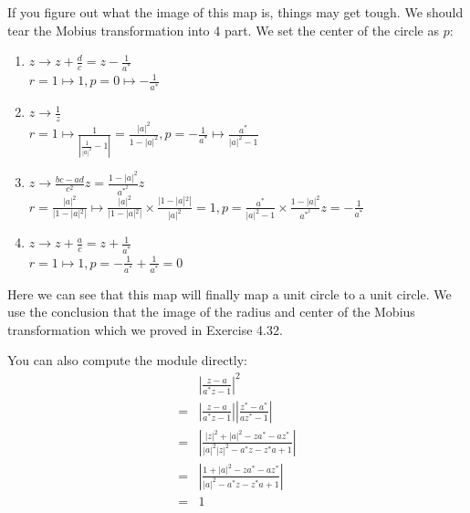 \documentclass[]{ctexart}
\begin{document}
		\subsubsection{}
			If you figure out what the image of this map is, things  may get tough. We should tear the Mobius transformation into 4 part. We set the center of the circle as $p$:
				\begin{enumerate}
					\item $z\rightarrow z+\frac{d}{c}=z-\frac{1}{a^*}$\\
					$r=1\mapsto 1, p=0\mapsto -\frac{1}{a^*}$
					\item $z\rightarrow \frac{1}{z}$\\
					$r=1\mapsto \frac{1}{|\frac{1}{|a|^2}-1|}=\frac{|a|^2}{1-|a|^2},p=-\frac{1}{a^*}\mapsto \frac{a^*}{|a|^2-1}$
					\item $z\rightarrow \frac{bc-ad}{c^2}z=\frac{1-|a|^2}{a^{*^2}}z$\\
					$r=\frac{|a|^2}{|1-|a|^2|}\mapsto \frac{|a|^2}{|1-|a|^2|}\times \frac{|1-|a|^2|}{|a|^2}=1, p=\frac{a^*}{|a|^2-1}\times \frac{1-|a|^2}{a^{*^2}}z=-\frac{1}{a^*}$
					\item $z\rightarrow  z+\frac{a}{c}=z+\frac{1}{a^*}$\\
					$r=1\mapsto 1,p=-\frac{1}{a^*}+\frac{1}{a^*}=0$
				\end{enumerate}
			
			Here we can see that this map will finally map a unit circle to a unit circle. We use the conclusion that the image of the radius and center of the Mobius transformation which we proved in Exercise 4.32. 
			
			You can also compute the module directly:
				\begin{equation*}
				\begin{aligned}
					&\left|\frac{z-a}{a^{*} z-1}\right|^{2} \\
					=&\left|\frac{z-a}{a^{*} z-1}\right|\left|\frac{z^{*}-a^{*}}{a z^{*}-1}\right| \\
					=&\left|\frac{|z|^{2}+|a|^{2}-z a^{*}-a z^{*}}{|a|^{2}|z|^{2}-a^{*} z-z^{*} a+1}\right| \\
					=&\left|\frac{1+|a|^{2}-z a^{*}-a z^{*}}{|a|^{2}-a^{*} z-z^{*} a+1}\right| \\
					=&1
				\end{aligned}
				\end{equation*}
		
\end{document}
